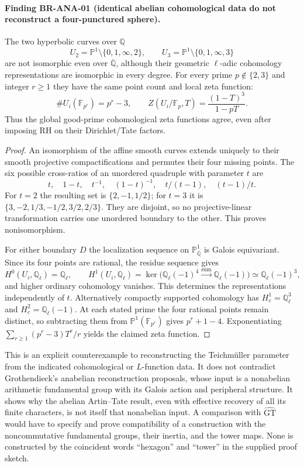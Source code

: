 \documentclass[11pt,a4paper]{article}
\theoremstyle{definition}\newtheorem{definition}[theorem]{Definition}
\theoremstyle{remark}\newtheorem{remark}[theorem]{Remark}
\begin{document}
\paragraph{Finding BR-ANA-01 (identical abelian cohomological data do not
reconstruct a four-punctured sphere).}
The two hyperbolic curves over $\mathbb Q$
\[
 U_2=\mathbb P^1\setminus\{0,1,\infty,2\},\qquad
 U_3=\mathbb P^1\setminus\{0,1,\infty,3\}
\]
are not isomorphic even over $\overline{\mathbb Q}$, although
their geometric $\ell$-adic cohomology representations are
isomorphic in every degree.  For every prime $p\notin\{2,3\}$
and integer $r\geq1$ they have the same point count and local zeta
function:
\[
 \#U_i(\mathbb F_{p^r})=p^r-3,\qquad
 Z(U_i/\mathbb F_p,T)=\frac{(1-T)^3}{1-pT}.
\]
Thus the global good-prime cohomological zeta functions agree,
even after imposing RH on their Dirichlet/Tate factors.

\begin{proof}
An isomorphism of the affine smooth curves extends uniquely to
their smooth projective compactifications and permutes their
four missing points.  The six possible cross-ratios of an
unordered quadruple with parameter $t$ are
\[
 t,\quad 1-t,\quad t^{-1},\quad(1-t)^{-1},\quad
 t/(t-1),\quad(t-1)/t.
\]
For $t=2$ the resulting set is $\{2,-1,1/2\}$; for $t=3$ it
is $\{3,-2,1/3,-1/2,3/2,2/3\}$.  They are disjoint, so no
projective-linear transformation carries one unordered boundary
to the other.  This proves nonisomorphism.

For either boundary $D$ the localization sequence on
$\mathbb P^1_{\overline{\mathbb Q}}$ is Galois equivariant.
Since its four points are rational, the residue sequence gives
\[
 H^0(U_i,\mathbb Q_\ell)=\mathbb Q_\ell,\qquad
 H^1(U_i,\mathbb Q_\ell)
 =\ker\bigl(\mathbb Q_\ell(-1)^4
             \xrightarrow{\text{sum}}\mathbb Q_\ell(-1)\bigr)
 \simeq\mathbb Q_\ell(-1)^3,
\]
and higher ordinary cohomology vanishes.  This determines the
representations independently of $t$.  Alternatively compactly
supported cohomology has $H_c^1=\mathbb Q_\ell^3$ and
$H_c^2=\mathbb Q_\ell(-1)$.
At each stated prime the four rational points remain distinct,
so subtracting them from $\mathbb P^1(\mathbb F_{p^r})$ gives
$p^r+1-4$.  Exponentiating
$\sum_{r\geq1}(p^r-3)T^r/r$ yields the claimed zeta function.
\end{proof}

This is an explicit counterexample to reconstructing the
Teichm\"uller parameter from the indicated cohomological or
$L$-function data.  It does not contradict Grothendieck's
anabelian reconstruction proposals, whose input is a nonabelian
arithmetic fundamental group with its Galois action and peripheral
structure.  It shows why the abelian Artin--Tate result, even with
effective recovery of all its finite characters, is not itself
that nonabelian input.  A comparison with $\widehat{\mathrm{GT}}$
would have to specify and prove compatibility of a construction
with the noncommutative fundamental groups, their inertia, and
the tower maps.  None is constructed by the coincident words
``hexagon'' and ``tower'' in the supplied proof sketch.
\end{document}
